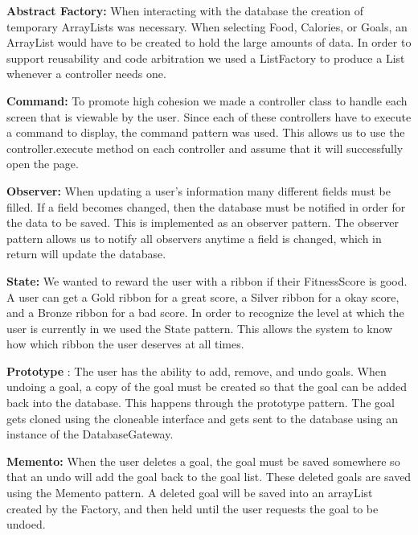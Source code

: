 \documentclass[10pt]{article}
\begin{document}
\textbf{Abstract Factory:} When interacting with the database the
creation of temporary ArrayLists was necessary. When selecting Food,
Calories, or Goals, an ArrayList would have to be created to hold the
large amounts of data. In order to support reusability and code
arbitration we used a ListFactory to produce a List whenever a
controller needs one.

\textbf{Command:} To promote high cohesion we made a controller class to
handle each screen that is viewable by the user. Since each of these
controllers have to execute a command to display, the command pattern
was used. This allows us to use the controller.execute method on each
controller and assume that it will successfully open the page.

\textbf{Observer:} When updating a user's information many different
fields must be filled. If a field becomes changed, then the database
must be notified in order for the data to be saved. This is implemented
as an observer pattern. The observer pattern allows us to notify all
observers anytime a field is changed, which in return will update the
database.

\textbf{State:} We wanted to reward the user with a ribbon if their
FitnessScore is good. A user can get a Gold ribbon for a great score, a
Silver ribbon for a okay score, and a Bronze ribbon for a bad score. In
order to recognize the level at which the user is currently in we used
the State pattern. This allows the system to know how which ribbon the
user deserves at all times.

\textbf{Prototype} : The user has the ability to add, remove, and undo
goals. When undoing a goal, a copy of the goal must be created so that
the goal can be added back into the database. This happens through the
prototype pattern. The goal gets cloned using the cloneable interface
and gets sent to the database using an instance of the DatabaseGateway.

\textbf{Memento:} When the user deletes a goal, the goal must be saved
somewhere so that an undo will add the goal back to the goal list. These
deleted goals are saved using the Memento pattern. A deleted goal will
be saved into an arrayList created by the Factory, and then held until
the user requests the goal to be undoed.
\end{document}

